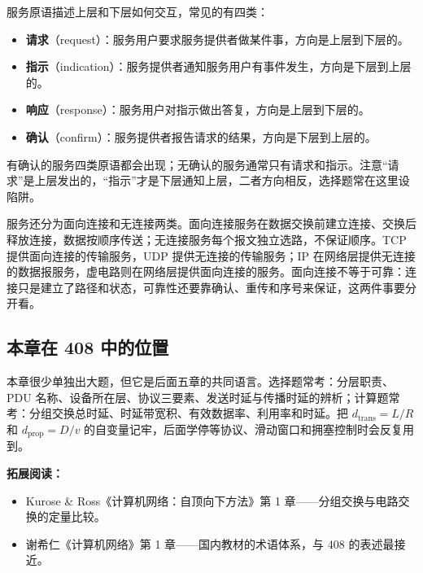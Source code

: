 服务原语描述上层和下层如何交互，常见的有四类：
\begin{itemize}
  \item \textbf{请求}（request）：服务用户要求服务提供者做某件事，方向是上层到下层的。
  \item \textbf{指示}（indication）：服务提供者通知服务用户有事件发生，方向是下层到上层的。
  \item \textbf{响应}（response）：服务用户对指示做出答复，方向是上层到下层的。
  \item \textbf{确认}（confirm）：服务提供者报告请求的结果，方向是下层到上层的。
\end{itemize}
有确认的服务四类原语都会出现；无确认的服务通常只有请求和指示。注意“请求”是上层发出的，“指示”才是下层通知上层，二者方向相反，选择题常在这里设陷阱。

服务还分为面向连接和无连接两类。面向连接服务在数据交换前建立连接、交换后释放连接，数据按顺序传送；无连接服务每个报文独立选路，不保证顺序。TCP 提供面向连接的传输服务，UDP 提供无连接的传输服务；IP 在网络层提供无连接的数据报服务，虚电路则在网络层提供面向连接的服务。面向连接不等于可靠：连接只是建立了路径和状态，可靠性还要靠确认、重传和序号来保证，这两件事要分开看。

\subsection{本章在 408 中的位置}

本章很少单独出大题，但它是后面五章的共同语言。选择题常考：分层职责、PDU 名称、设备所在层、协议三要素、发送时延与传播时延的辨析；计算题常考：分组交换总时延、时延带宽积、有效数据率、利用率和时延。把 $d_{\mathrm{trans}}=L/R$ 和 $d_{\mathrm{prop}}=D/v$ 的自变量记牢，后面学停等协议、滑动窗口和拥塞控制时会反复用到。

\noindent\textbf{拓展阅读：}
\begin{itemize}
    \item Kurose \& Ross《计算机网络：自顶向下方法》第 1 章——分组交换与电路交换的定量比较。
    \item 谢希仁《计算机网络》第 1 章——国内教材的术语体系，与 408 的表述最接近。
\end{itemize}

\newpage

